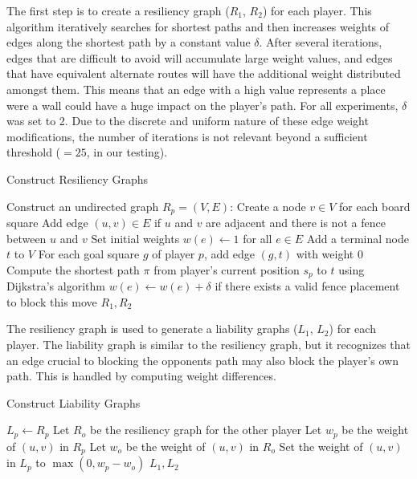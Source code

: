 \documentclass[10pt]{article}
\begin{document}
The first step is to create a resiliency graph ($R_1$, $R_2$) for each player.  This algorithm iteratively searches for shortest paths and then increases weights of edges along the shortest path by a constant value $\delta$. After several iterations, edges that are difficult to avoid will accumulate large weight values, and edges that have equivalent alternate routes will have the additional weight distributed amongst them. This means that an edge with a high value represents a place were a wall could have a huge impact on the player's path. For all experiments, $\delta$ was set to 2. Due to the discrete and uniform nature of these edge weight modifications, the number of iterations is not relevant beyond a sufficient threshold ($=25$, in our testing).
\begin{algorithm}
\caption{Construct Resiliency Graphs}
\begin{algorithmic}[1]
    \State Construct an undirected graph $R_p = (V, E)$:
    \State \hspace{1em} Create a node $v \in V$ for each board square
    \State \hspace{1em} Add edge $(u, v) \in E$ if $u$ and $v$ are adjacent and there is not a fence between $u$ and $v$
     \State \hspace{1em} Set initial weights $w(e) \gets 1$ for all $e \in E$
    \State \hspace{1em} Add a terminal node $t$ to $V$
    \State \hspace{1em} For each goal square $g$ of player $p$, add edge $(g, t)$ with weight 0
        \State Compute the shortest path $\pi$ from player's current position $s_p$ to $t$ using Dijkstra's algorithm
            \State $w(e) \gets w(e) + \delta$ if there exists a valid fence placement to block this move
        \EndFor
    \EndFor
\EndFor
\State \Return $R_1, R_2$
\end{algorithmic}
\end{algorithm}
\FloatBarrier
The resiliency graph is used to generate a liability graphs ($L_1$, $L_2$) for each player. The liability graph is similar to the resiliency graph, but it recognizes that an edge crucial to blocking the opponents path may also block the player's own path. This is handled by computing weight differences.  

\begin{algorithm}
\caption{Construct Liability Graphs}
\begin{algorithmic}[1]
    \State $L_p \gets R_p$
    \State Let $R_o$ be the resiliency graph for the other player
        \State Let $w_p$ be the weight of $(u, v)$ in $R_p$
        \State Let $w_o$ be the weight of $(u, v)$ in $R_o$
        \State Set the weight of $(u, v)$ in $L_p$ to $\max(0, w_p - w_o)$
    \EndFor
\EndFor
\State \Return $L_1, L_2$
\end{algorithmic}
\end{algorithm}
\end{document}
